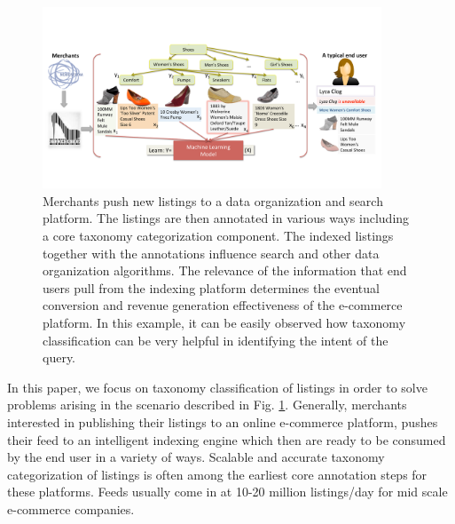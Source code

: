 \begin{figure}[ht]
	\centering
	\includegraphics[width=0.9\textwidth]{images/push-pull}
	\vspace{-0.2cm}
	\caption{{\small Merchants push new listings to a data organization and search platform. The listings are then annotated in various ways including a core taxonomy categorization component. The indexed listings together with the annotations influence search and other data organization algorithms. The relevance of the information that end users pull from the indexing platform determines the eventual conversion and revenue generation effectiveness of the e-commerce platform. In this example, it can be easily observed how taxonomy classification can be very helpful in identifying the intent of the query.}}
	\label{Fig:push-pull}
	\vspace{-0.6cm}
\end{figure}

In this paper, we focus on taxonomy classification of listings in order to solve problems arising in the scenario described in Fig. \ref{Fig:push-pull}.
Generally, merchants interested in publishing their listings to an online e-commerce platform, pushes their feed to an intelligent indexing engine which then are ready to be consumed by the end user in a variety of ways.
Scalable and accurate taxonomy categorization of listings is often among the earliest core annotation steps for these platforms.
Feeds usually come in at 10-20 million listings/day for mid scale e-commerce companies.

